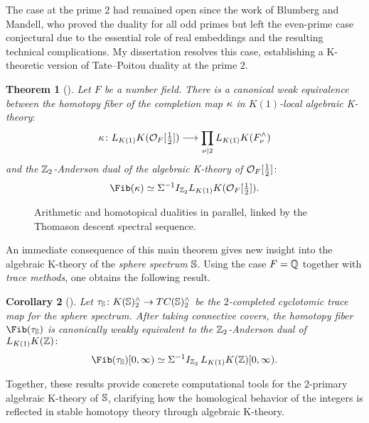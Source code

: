 \documentclass[11pt]{article}
\newtheorem{theorem}{Theorem}
\newtheorem{corollary}[theorem]{Corollary}
\begin{document}
The case at the prime $2$ had remained open since the work of Blumberg and Mandell, who proved the duality for all odd primes but left the even-prime case conjectural due to the essential role of real embeddings and the resulting technical complications.
My dissertation resolves this case, establishing a K-theoretic version of Tate–Poitou duality at the prime $2$.

\begin{theorem}[\cite{Cho}]
Let $F$ be a number field.
There is a canonical weak equivalence between  the {\it homotopy fiber of the completion map} $\kappa$ in $K(1)$-local algebraic K-theory$\colon$
\[\kappa\colon L_{K(1)}K({\mathcal{O}}_F[\tfrac{1}{2}]) \longrightarrow \prod_{\nu \mid 2} L_{K(1)}K(F_\nu^\wedge)\]
and the $\mathbb{Z}_2$-Anderson dual of the algebraic K-theory of ${\mathcal{O}}_F[\tfrac{1}{2}]\colon$
 \begin{equation}\label{fib}
 \Fib(\ka) \simeq \SI^{-1} I_{\bZ_2} L_{K(1)}K(\calO_F[\tfrac{1}{2}]).
\end{equation}
\end{theorem}

\begin{figure}[h]
\centering
{}
\captionsetup{font=footnotesize, skip=0em}
\caption{
Arithmetic and homotopical dualities in parallel,
linked by the Thomason descent spectral sequence.
}
\end{figure}

An immediate consequence of this main theorem gives new insight into the algebraic K-theory of the {\it sphere spectrum} $\mathbb{S}$.
Using the case $F=\mathbb{Q}$ together with {\it trace methods}, one obtains the following result.

\begin{corollary}[\cite{Cho}]
Let $\tau_{\mathbb{S}}\colon K(\mathbb{S})_2^\wedge \to TC(\mathbb{S})_2^\wedge$ be the $2$-completed cyclotomic trace map for the sphere spectrum.
After taking connective covers, the homotopy fiber $\Fib(\ta_\bS)$ is canonically weakly equivalent to the $\mathbb{Z}_2$-Anderson dual of $L_{K(1)}K(\mathbb{Z})\colon$
\[\Fib(\ta_\bS)[0,\infty) \simeq \Sigma^{-1} I_{\bZ_2}\, L_{K(1)}K(\bZ)[0,\infty).\]
\end{corollary}
Together, these results provide concrete computational tools for the $2$-primary algebraic K-theory of $\mathbb{S}$, clarifying how the homological behavior of the integers is reflected in stable homotopy theory through algebraic K-theory.
\end{document}
